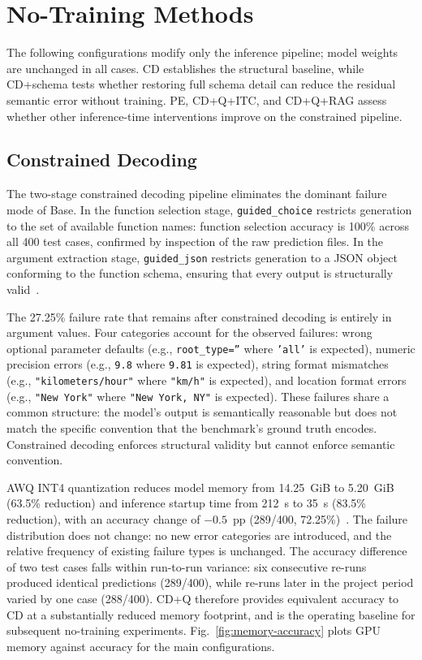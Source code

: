\section{No-Training Methods}
\label{sec:no-training}

The following configurations modify only the inference pipeline; model weights
are unchanged in all cases. CD establishes the structural baseline, while
CD+schema tests whether restoring full schema detail can reduce the residual
semantic error without training. PE, CD+Q+ITC, and CD+Q+RAG assess whether
other inference-time interventions improve on the constrained pipeline.

\subsection{Constrained Decoding}
\label{sec:cd-results}

The two-stage constrained decoding pipeline eliminates the dominant failure mode
of Base. In the function selection stage, \texttt{guided\_choice} restricts
generation to the set of available function names: function selection accuracy
is 100\% across all 400 test cases, confirmed by inspection of the raw
prediction files. In the argument extraction stage, \texttt{guided\_json}
restricts generation to a JSON object conforming to the function schema,
ensuring that every output is structurally valid~\cite{willard2023efficient,
kwon2023vllm}.

The 27.25\% failure rate that remains after constrained decoding is entirely in
argument values. Four categories account for the observed failures: wrong
optional parameter defaults (e.g., \texttt{root\_type=''} where
\texttt{'all'} is expected), numeric precision errors (e.g., \texttt{9.8}
where \texttt{9.81} is expected), string format mismatches (e.g.,
\texttt{"kilometers/hour"} where \texttt{"km/h"} is expected), and location
format errors (e.g., \texttt{"New York"} where \texttt{"New York, NY"} is
expected). These failures share a common structure: the model's output is
semantically reasonable but does not match the specific convention that the
benchmark's ground truth encodes. Constrained decoding enforces structural
validity but cannot enforce semantic convention.

AWQ INT4 quantization reduces model memory from 14.25~GiB to 5.20~GiB (63.5\%
reduction) and inference startup time from 212~s to 35~s (83.5\% reduction),
with an accuracy change of $-0.5$~pp (289/400, 72.25\%)~\cite{lin2024awq}.
The failure distribution does not change: no new error categories are
introduced, and the relative frequency of existing failure types is unchanged.
The accuracy difference of two test cases falls within run-to-run variance:
six consecutive re-runs produced identical predictions (289/400), while
re-runs later in the project period varied by one case (288/400). CD+Q
therefore provides equivalent accuracy to CD at a substantially
reduced memory footprint, and is the operating baseline for subsequent
no-training experiments. Fig.~\ref{fig:memory-accuracy} plots GPU memory
against accuracy for the main configurations.

